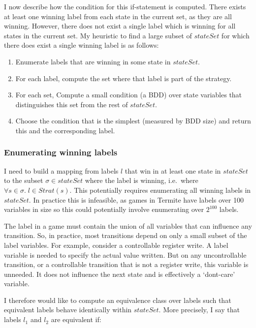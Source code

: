 I now describe how the condition for this if-statement is computed. There exists at least one winning label from each state in the current set, as they are all winning. However, there does not exist a single label which is winning for all states in the current set. My heuristic to find a large subset of $stateSet$ for which there does exist a single winning label is as follows:

\begin{enumerate}
    \item Enumerate labels that are winning in some state in $stateSet$.
    \item For each label, compute the set where that label is part of the strategy.
    \item For each set, Compute a small condition (a BDD) over state variables that distinguishes this set from the rest of $stateSet$.
    \item Choose the condition that is the simplest (measured by BDD size) and return this and the corresponding label.
\end{enumerate}

\subsubsection{Enumerating winning labels}

I need to build a mapping from labels $l$ that win in at least one state in $stateSet$ to the subset $\sigma \in stateSet$ where the label is winning, i.e.\ where $\forall s \in \sigma . \; l \in Strat(s)$. This potentially requires enumerating all winning labels in $stateSet$. In practice this is infeasible, as games in Termite have labels over 100 variables in size so this could potentially involve enumerating over $2^{100}$ labels. 

The label in a game must contain the union of all variables that can influence any transition. So, in practice, most transitions depend on only a small subset of the label variables. For example, consider a controllable register write. A label variable is needed to specify the actual value written. But on any uncontrollable transition, or a controllable transition that is not a register write, this variable is unneeded. It does not influence the next state and is effectively a `dont-care' variable.

I therefore would like to compute an equivalence class over labels such that equivalent labels behave identically within $stateSet$. More precisely, I say that labels $l_1$ and $l_2$ are equivalent if:

